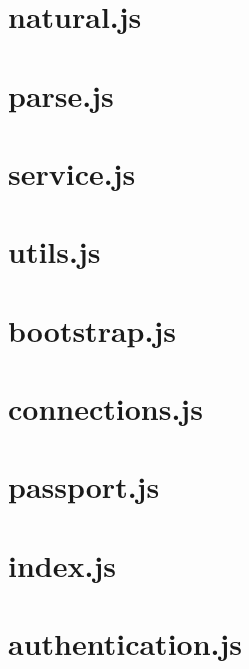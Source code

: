 \documentclass[a4paper,landscape]{report}
\begin{document}
\newpage
\section{natural.js}


\newpage
\section{parse.js}


\newpage
\section{service.js}


\newpage
\section{utils.js}


\newpage
\section{bootstrap.js}


\newpage
\section{connections.js}


\newpage
\section{passport.js}


\newpage
\section{index.js}


\newpage
\section{authentication.js}

\end{document}
